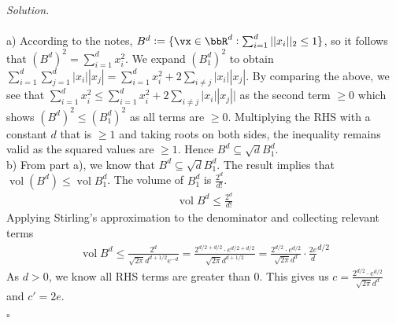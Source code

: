 \documentclass[11pt]{article}
\newcommand{\vol}{\ensuremath{\operatorname{vol}}} %
\newcommand{\unitball}[1][d]{\ensuremath{B^{#1}}} %
\theoremstyle{definition}
\newenvironment{solution}{\noindent\emph{Solution.}}{\hfill$\square$}
\begin{document}
\begin{solution}
\\ \\a) According to the notes, $\unitball := \cbr[0]{ \vx \in \bbR^d : \sum_{i=1}^d ||x_i||_2 \leq 1}$, so it follows that $(\unitball)^2 = \sum_{i=1}^d x_i^2$. We expand $(B_1^d)^2$ to obtain $\sum_{i=1}^d \sum_{j=1}^d |x_i| |x_j| = \sum_{i=1}^d x_i^2 + 2 \sum_{i \neq j} |x_i| |x_j|$. By comparing the above, we see that $\sum_{i=1}^d x_i^2 \leq \sum_{i=1}^d x_i^2 + 2 \sum_{i \neq j} |x_i| |x_j| |$ as the second term $\geq 0$ which shows $(\unitball)^2 \leq (B_1^d)^2$ as all terms are $\geq 0$. Multiplying the RHS with a constant $d$ that is $\geq 1$  and taking roots on both sides, the inequality remains valid as the squared values are $\geq 1$. Hence $\unitball \subseteq \sqrt{d} B_1^d$.
\newline
\\b) From part a), we know that $\unitball \subseteq \sqrt{d} B_1^d$. The result implies that $\vol(\unitball) \leq \vol{B^d_1}$. The volume of $B^d_1$ is $\frac{2^d}{d!}$.
\begin{align*}
\vol{\unitball} \leq \frac{2^d}{d!}
\end{align*}
Applying Stirling's approximation to the denominator and collecting relevant terms
\begin{align*}
\vol{\unitball} \leq \frac{2^d}{\sqrt{2\pi} d^{d+1/2} e^{-d}} = \frac{2^{d/2 + d/2} \cdot e^{d/2 + d/2} }{\sqrt{2\pi} d^{d+1/2}} = \frac{2^{d/2} \cdot e^{d/2}}{\sqrt{2\pi} d^{d}} \cdot \frac{2e}{d}^{d/2}
\end{align*}
As $d > 0$, we know all RHS terms are greater than 0. This gives us $c = \frac{2^{d/2} \cdot e^{d/2}}{\sqrt{2\pi} d^{d}}$ and $c' = 2e$.

\end{solution}

\newpage

\end{document}
